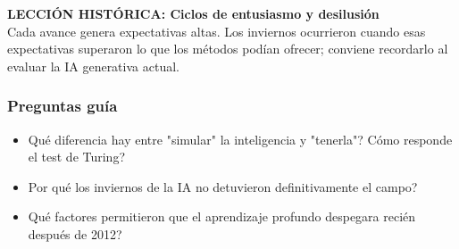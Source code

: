 \begin{cajagris}
\textbf{LECCIÓN HISTÓRICA: Ciclos de entusiasmo y desilusión}\\
Cada avance genera expectativas altas. Los inviernos ocurrieron cuando esas expectativas superaron lo que los métodos podían ofrecer; conviene recordarlo al evaluar la IA generativa actual.
\end{cajagris}

\subsubsection*{Preguntas guía}
\begin{itemize}
    \item \textquestiondown Qué diferencia hay entre "simular" la inteligencia y "tenerla"? \textquestiondown Cómo responde el test de Turing?
    \item \textquestiondown Por qué los inviernos de la IA no detuvieron definitivamente el campo?
    \item \textquestiondown Qué factores permitieron que el aprendizaje profundo despegara recién después de 2012?
\end{itemize}

